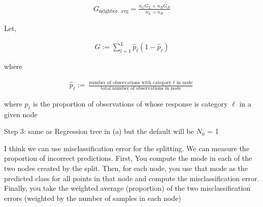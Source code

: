\documentclass[12pt]{article}
\begin{document}
\begin{enumerate}
\begin{align*}
    G_{\text{neighbor, avg}} = \frac{n_L G_L + n_R G_R}{n_L + n_R}
\end{align*}

Let,

\begin{align*}
    G := \sum_{l=1}^{L}\hat{p}_\ell(1 - \hat{p}_\ell)
\end{align*}

where

\begin{align*}
    \hat{p}_\ell := \frac{
        \text{number of observations with category $\ell$ in node}}
    {\text{total number of observations in node}}
\end{align*}


where $\hat{p}_\ell$ is the proportion of observations of whose response is category $\ell$ in a given node

Step 3: same as Regression tree in (a) but the default will be $N_0$ = 1



I think we can use misclassification error for the splitting. We can measure the proportion of incorrect predictions. First, You compute the mode in each of the two nodes created by the split. Then, for each node, you use that mode as the predicted class for all points in that node and compute the misclassification error. Finally, you take the weighted average (proportion) of the two misclassification errors (weighted by the number of samples in each node)


\end{enumerate}
\end{document}
